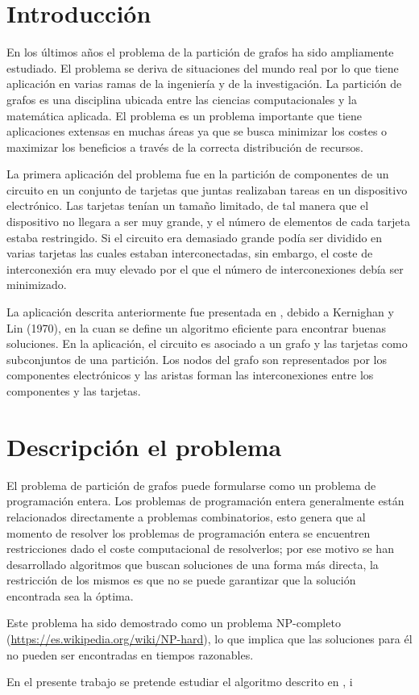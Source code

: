 \section{Introducción}
En los últimos años el problema de la partición de grafos ha sido ampliamente estudiado. El problema se deriva de situaciones del mundo real por lo que tiene aplicación en varias ramas de la ingeniería y de la investigación. La partición de grafos es una disciplina ubicada entre las ciencias computacionales y la matemática aplicada. El problema es un problema importante que tiene aplicaciones extensas en muchas áreas ya que se busca minimizar los costes o maximizar los beneficios a través de la correcta distribución de recursos. 

La primera aplicación del problema fue en la partición de componentes de un circuito en un conjunto de tarjetas que juntas realizaban tareas en un dispositivo electrónico. Las tarjetas tenían un tamaño limitado, de tal manera que el dispositivo no llegara a ser muy grande, y el número de elementos de cada tarjeta estaba restringido. Si el circuito era demasiado grande podía ser dividido en varias tarjetas las cuales estaban interconectadas, sin embargo, el coste de interconexión era muy elevado por el que el número de interconexiones debía ser minimizado.

La aplicación descrita anteriormente fue presentada en \cite{KernighanLin}, debido a Kernighan y Lin (1970), en la cuan se define un algoritmo eficiente para encontrar buenas soluciones. En la aplicación, el circuito es asociado a un grafo y las tarjetas como subconjuntos de una partición. Los nodos del grafo son representados por los componentes electrónicos y las aristas forman las interconexiones entre los componentes y las tarjetas.

\section{Descripción el problema}
El problema de partición de grafos puede formularse como un problema de programación entera. Los problemas de programación entera generalmente están relacionados directamente a problemas combinatorios, esto genera que al momento de resolver los problemas de programación entera se encuentren restricciones dado el coste computacional de resolverlos; por ese motivo se han desarrollado algoritmos que buscan soluciones de una forma más directa, la restricción de los mismos es que no se puede garantizar que la solución encontrada sea la óptima. 

Este problema ha sido demostrado como un problema NP-completo (\url{https://es.wikipedia.org/wiki/NP-hard}), lo que implica que las soluciones para él no pueden ser encontradas en tiempos razonables.

En el presente trabajo se pretende estudiar el algoritmo descrito en \cite{KernighanLin}, \cite{FiducciaMattheyses} i 
